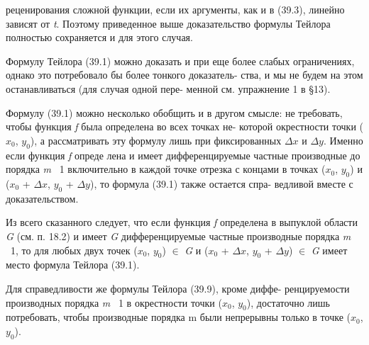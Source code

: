 \documentclass[10pt]{book}
\begin{document}
	\begin{spacing}{0.96}
	   \noindent реценирования сложной функции, если их аргументы, как и в (39.3), \linebreak
	   линейно зависят от \textit {t}. Поэтому приведенное выше доказательство \linebreak
	   формулы Тейлора полностью сохраняется и для этого случая.
	   
	   Формулу Тейлора (39.1) можно доказать и при еще более слабых \linebreak
	   ограничениях, однако это потребовало бы более тонкого доказатель-\linebreak
	   ства, и мы не будем на этом останавливаться (для случая одной пере-\linebreak
	   менной см. упражнение 1 в \S 13).
	 
	   Формулу (39.1) можно несколько обобщить и в другом смысле: \linebreak
	   не требовать, чтобы функция \textit {f} была определена во всех точках не- \linebreak
	   которой окрестности точки ($x_0$, $y_0$), а рассматривать эту формулу \linebreak
	   лишь при фиксированных $\Delta x$ и $\Delta y$. Именно если функция \textit {f} опреде
	   лена и имеет дифференцируемые частные производные до порядка \linebreak
	   \textit {m} \textemdash~1 включительно в каждой точке отрезка с концами в точках \linebreak
	   ($x_0$, $y_0$) и ($x_0$ +  $\Delta x$, $y_0$ + $\Delta y$), то формула (39.1) также остается спра-
	    \linebreak ведливой вместе с доказательством.
	   
	   Из всего сказанного следует, что если функция \textit {f} определена в выпуклой области \textit {G} (см. п. 18.2) и имеет \textit{G} дифференцируемые частные производные порядка \textit {m} \textemdash~1, то для любых двух точек ($x_0$, $y_0$) $\in$ \textit {G} \linebreak
	   и ($x_0$ +  $\Delta x$, $y_0$ + $\Delta y$) $\in$ \textit{G} имеет место формула Тейлора (39.1).
	   
	   Для справедливости же формулы Тейлора (39.9), кроме диффе- \linebreak
	   ренцируемости производных порядка \textit {m} \textemdash~1 в окрестности точки \linebreak
	   ($x_0$, $y_0$), достаточно лишь потребовать, чтобы производные порядка m
	   были непрерывны только в точке ($x_0$, $y_0$).
	   

\end{spacing}
\end{document}
